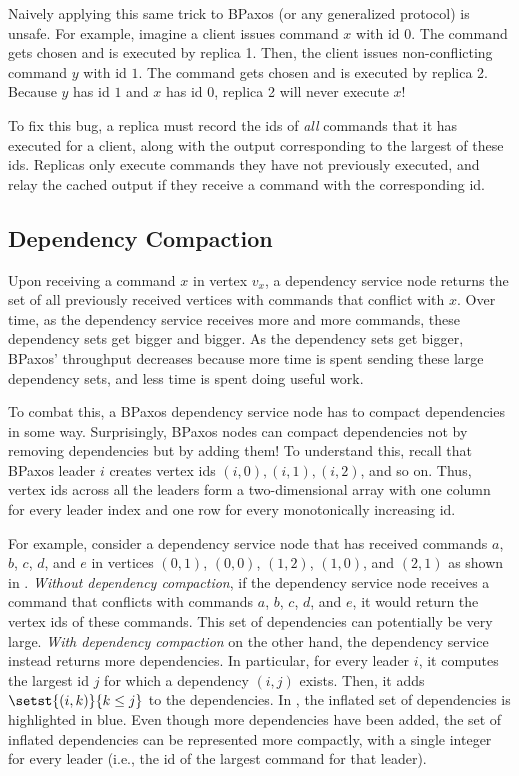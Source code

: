Naively applying this same trick to BPaxos (or any generalized protocol) is
unsafe. For example, imagine a client issues command $x$ with id $0$. The
command gets chosen and is executed by replica 1. Then, the client issues
non-conflicting command $y$ with id $1$. The command gets chosen and is
executed by replica 2. Because $y$ has id $1$ and $x$ has id $0$, replica 2
will never execute $x$!

To fix this bug, a replica must record the ids of \emph{all} commands that it
has executed for a client, along with the output corresponding to the largest
of these ids. Replicas only execute commands they have not previously executed,
and relay the cached output if they receive a command with the corresponding
id.


\subsection{Dependency Compaction}
Upon receiving a command $x$ in vertex $v_x$, a dependency service node returns
the set of all previously received vertices with commands that conflict with
$x$. Over time, as the dependency service receives more and more commands,
these dependency sets get bigger and bigger. As the dependency sets get bigger,
BPaxos' throughput decreases because more time is spent sending these large
dependency sets, and less time is spent doing useful work.

To combat this, a BPaxos dependency service node has to compact dependencies in
some way. Surprisingly, BPaxos nodes can compact dependencies not by removing
dependencies but by adding them! To understand this, recall that BPaxos leader
$i$ creates vertex ids $(i, 0), (i, 1), (i, 2)$, and so on. Thus, vertex ids
across all the leaders form a two-dimensional array with one column for every
leader index and one row for every monotonically increasing id.

For example, consider a dependency service node that has received commands $a$,
$b$, $c$, $d$, and $e$ in vertices $(0, 1)$, $(0, 0)$, $(1, 2)$, $(1, 0)$, and
$(2, 1)$ as shown in . \emph{Without dependency
compaction}, if the dependency service node receives a command that conflicts
with commands $a$, $b$, $c$, $d$, and $e$, it would return the vertex ids of
these commands. This set of dependencies can potentially be very large.
\emph{With dependency compaction} on the other hand, the dependency service
instead returns more dependencies. In particular, for every leader $i$, it
computes the largest id $j$ for which a dependency $(i, j)$ exists. Then, it
adds $\setst{(i, k)}{k \leq j}$ to the dependencies. In
, the inflated set of dependencies is highlighted
in blue. Even though more dependencies have been added, the set of inflated
dependencies can be represented more compactly, with a single integer for every
leader (i.e., the id of the largest command for that leader).

